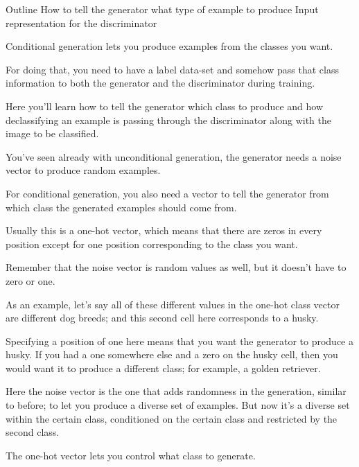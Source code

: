 \documentclass[11pt, onecolumn]{article}
\begin{document}
Outline
How to tell the generator what type of example to produce
Input representation for the discriminator

Conditional generation lets you produce examples from the classes you want.

For doing that, you need to have a label data-set and somehow pass
that class information to both the generator and the discriminator during training.

Here you'll learn how to tell the generator which class to produce and how
declassifying an example is passing through the discriminator along with the image to be classified.

You've seen already with unconditional generation, the generator needs a noise vector to produce random examples.

For conditional generation, you also need a vector to tell the generator from which class the generated examples should come from.

Usually this is a one-hot vector, which means that there are zeros in every position except for one position corresponding to the class you want.

Remember that the noise vector is random values as well, but it doesn't have to zero or one.

As an example, let's say all of these different values in the one-hot class vector are different dog breeds; and this second cell here corresponds to a husky.

Specifying a position of one here means that you want the generator to produce a husky. If you had a one somewhere else and a zero on the husky cell, then you would want it to produce a different class; for example, a golden retriever.

Here the noise vector is the one that adds randomness in the generation,
similar to before; to let you produce a diverse set of examples. But now it's a diverse set within the certain class, conditioned on the certain class
and restricted by the second class.

The one-hot vector lets you control what class to generate.
\end{document}
